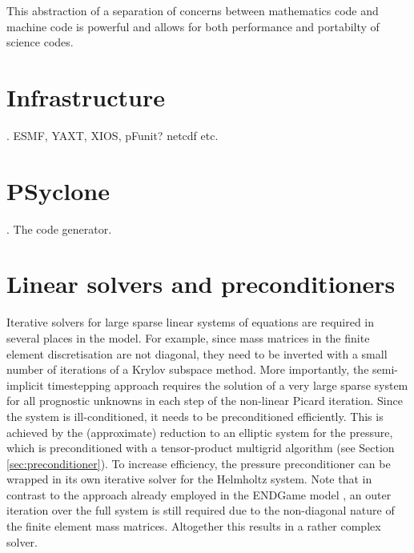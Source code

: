 \documentclass[times]{elsarticle}
\begin{document}
This abstraction of a separation of concerns between mathematics code
and machine code is powerful and allows for both performance and
portabilty of science codes.

\section{\label{sec:lib}Infrastructure}.
ESMF, YAXT, XIOS, pFunit? netcdf etc.

\section{\label{sec:Psyclone}PSyclone}.
The code generator.

\section{\label{sec:Solver}Linear solvers and preconditioners}
Iterative solvers for large sparse linear systems of equations are required in several places in the model. For example, since mass matrices in the finite element discretisation are not diagonal, they need to be inverted with a small number of iterations of a Krylov subspace method. More importantly, the semi-implicit timestepping approach requires the solution of a very large sparse system for all prognostic unknowns in each step of the non-linear Picard iteration. Since the system is ill-conditioned, it needs to be preconditioned efficiently. This is achieved by the (approximate) reduction to an elliptic system for the pressure, which is preconditioned with a tensor-product multigrid algorithm \cite{Borm2001} (see Section \ref{sec:preconditioner}). To increase efficiency, the pressure preconditioner can be wrapped in its own iterative solver for the Helmholtz system. Note that in contrast to the  approach already employed in the ENDGame model \cite{QJ:QJ2235}, an outer iteration over the full system is still required due to the non-diagonal nature of the finite element mass matrices. Altogether this results in a rather complex solver.
\end{document}
